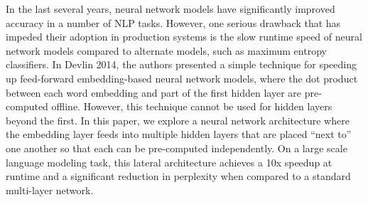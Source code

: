 In the last several years, neural network models have significantly improved accuracy in a number of NLP tasks. However, one serious drawback that has impeded their adoption in production systems is the slow runtime speed of neural network models compared to alternate models, such as maximum entropy classifiers. In Devlin 2014, the authors presented a simple technique for speeding up feed-forward embedding-based neural network models, where the dot product between each word embedding and part of the first hidden layer are pre-computed offline. However, this technique cannot be used for hidden layers beyond the first. In this paper, we explore a neural network architecture where the embedding layer feeds into multiple hidden layers that are placed ``next to'' one another so that each can be pre-computed independently. On a large scale language modeling task, this lateral architecture achieves a 10x speedup at runtime and a significant reduction in perplexity when compared to a standard multi-layer network.
